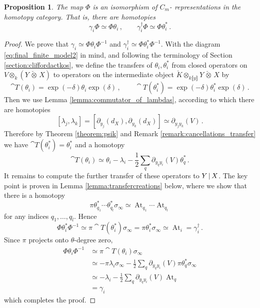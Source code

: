 \documentclass[english,letter paper,12pt,leqno]{article}
\newtheorem{proposition}[theorem]{Proposition}
\theoremstyle{example}
\numberwithin{equation}{section}
\def\be{\begin{equation}}
\def\ee{\end{equation}}
\DeclareMathOperator{\At}{At}
\begin{document}
\begin{proposition}\label{prop:clifford_action} The map $\Phi$ is an isomorphism of $C_m$- representations in the homotopy category. That is, there are homotopies
\[
\gamma_i \Phi \simeq \Phi \theta_i \,, \qquad \gamma_i^\dagger \Phi \simeq \Phi \theta_i^*\,.
\]
\end{proposition}
\begin{proof}
We prove that $\gamma_i \simeq \Phi \theta_i \Phi^{-1}$ and $\gamma_i^\dagger \simeq \Phi \theta_i^* \Phi^{-1}$. With the diagram \eqref{eq:final_finite_model2} in mind, and following the terminology of Section \ref{section:cliffordactkos}, we define the transfers of $\theta_i, \theta_i^*$ from closed operators on $V \otimes_k ( Y \,\check{\otimes}\, X )$ to operators on the intermediate object $\check{K} \otimes_{k\llbracket y \rrbracket} Y \,\check{\otimes}\, X$ by
\[
\cat{T}(\theta_i) = \exp(-\delta) \theta_i \exp(\delta)\,, \qquad \cat{T}(\theta_i^*) = \exp(-\delta) \theta_i^* \exp(\delta)\,.
\]
Then we use Lemma \ref{lemma:commutator_of_lambdas}, according to which there are homotopies
\[
[ \lambda_j, \lambda_k ] = [ \partial_{y_j}(d_X), \partial_{y_k}(d_X) ] \simeq \partial_{y_jy_k}(V)\,.
\]
Therefore by Theorem \ref{theorem:psik} and Remark \ref{remark:cancellations_transfer} we have $\cat{T}(\theta_i^*) = \theta_i^*$ and a homotopy
\be\label{eq:comp338h}
\cat{T}(\theta_i) \simeq \theta_i - \lambda_i - \frac{1}{2}\sum_q \partial_{y_q y_i}(V) \theta_q^*\,.
\ee
It remains to compute the further transfer of these operators to $Y \,|\, X$. The key point is proven in Lemma \ref{lemma:transfercreations} below, where we show that there is a homotopy
\be\label{eq:transfercr}
\pi \theta_{q_1}^* \cdots \theta_{q_l}^* \sigma_\infty \simeq \At_{q_1} \cdots \At_{q_l}
\ee
for any indices $q_1,\ldots,q_l$. Hence
\[
\Phi \theta_i^* \Phi^{-1} \simeq \pi \cat{T}(\theta_i^*) \sigma_\infty = \pi \theta_i^* \sigma_\infty \simeq \At_i = \gamma_i^\dagger\,.
\]
Since $\pi$ projects onto $\theta$-degree zero,
\begin{align*}
\Phi \theta_i \Phi^{-1} &\simeq \pi \cat{T}(\theta_i) \sigma_\infty\\
&\simeq - \pi \lambda_i \sigma_\infty - \frac{1}{2} \sum_q \partial_{y_qy_i}(V) \pi \theta_q^* \sigma_\infty\\
&\simeq - \lambda_i - \frac{1}{2}\sum_q \partial_{y_qy_i}(V) \At_q\\
&= \gamma_i
\end{align*}
which completes the proof.
\end{proof}
\end{document}
